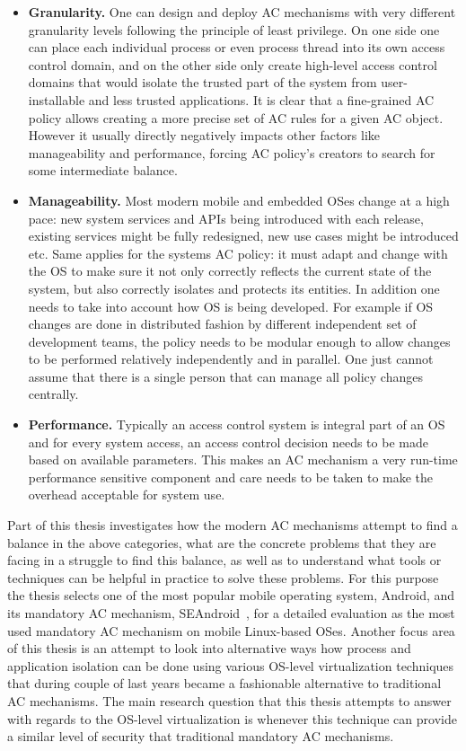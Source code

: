 \begin{itemize}
	\item \textbf{Granularity.} One can design and deploy AC mechanisms with very different granularity levels following the principle of least privilege. On one side one can place each individual process or even process thread into its own access control domain, and on the other side only create high-level access control domains that would isolate the trusted part of the system from user-installable and less trusted applications. It is clear that a fine-grained AC policy allows creating a more precise set of AC rules for a given AC object. However it usually directly negatively impacts other factors like manageability and performance, forcing AC policy's creators to search for some intermediate balance.
	\item \textbf{Manageability.} Most modern mobile and embedded OSes change at a high pace: new system services and APIs being introduced with each release, existing services might be fully redesigned, new use cases might be introduced etc. Same applies for the systems AC policy: it must adapt and change with the OS to make sure it not only correctly reflects the current state of the system, but also correctly isolates and protects its entities. In addition one needs to take into account how OS is being developed. For example if OS changes are done in distributed fashion by different independent set of development teams, the policy needs to be modular enough to allow changes to be performed relatively independently and in parallel. One just cannot assume that there is a single person that can manage all policy changes centrally.  
	\item \textbf{Performance.} Typically an access control system is integral part of an OS and for every system access, an access control decision needs to be made based on available parameters. This makes an AC mechanism a very run-time performance sensitive component and care needs to be taken to make the overhead acceptable for system use. 
\end{itemize}

Part of this thesis investigates how the modern AC mechanisms attempt to find a balance in the above categories, what are the concrete problems that they are facing in a struggle to find this balance, as well as to understand what tools or techniques can be helpful in practice to solve these problems. For this purpose the thesis selects one of the most popular mobile operating system, Android, and its mandatory AC mechanism, SEAndroid~\cite{smalley12}, for a detailed evaluation as the most used mandatory AC mechanism on mobile Linux-based OSes. Another focus area of this thesis is an attempt to look into alternative ways how process and application isolation can be done using various OS-level virtualization  techniques that during couple of last years became a fashionable alternative to traditional AC mechanisms. The main research question that this thesis attempts to answer with regards to the OS-level virtualization is whenever this technique can provide a similar level of security that traditional mandatory AC mechanisms. 


